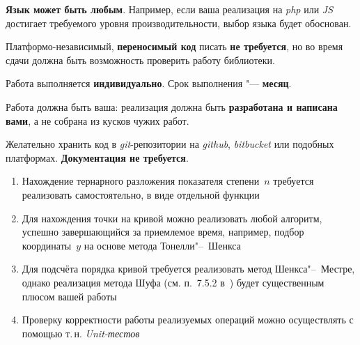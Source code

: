 \documentclass{ca-capstone}
\begin{document}
\textbf{Язык может быть любым}. Например, если ваша реализация на \emph{php} или \emph{JS}
достигает требуемого уровня производительности, выбор языка будет обоснован.

Платформо-независимый, \textbf{переносимый код} писать \textbf{не требуется}, но во время сдачи
должна быть возможность проверить работу библиотеки.

\schedule
Работа выполняется \textbf{индивидуально}. Срок выполнения "--- \textbf{месяц}.

Работа должна быть ваша: реализация должна быть \textbf{разработана и написана вами}, а не
собрана из кусков чужих работ.

Желательно хранить код в \emph{git}-репозитории на \emph{github}, \emph{bitbucket} или подобных
платформах. \textbf{Документация не требуется}.

\remarks
\begin{enumerate}
  \item Нахождение тернарного разложения показателя степени~$n$ требуется реализовать
    самостоятельно, в виде отдельной функции
  \item Для нахождения точки на кривой можно реализовать любой алгоритм, успешно завершающийся
    за приемлемое время, например, подбор координаты~$y$ на основе метода Тонелли"--~Шенкса
  \item Для подсчёта порядка кривой требуется реализовать метод Шенкса"--~Местре, однако
    реализация метода Шуфа (см. п.~7.5.2 в~\cite{crandall-pomerance}) будет существенным плюсом
    вашей работы
  \item Проверку корректности работы реализуемых операций можно осуществлять с помощью т.\,н.
    \emph{Unit-тестов}
\end{enumerate}

\end{document}
